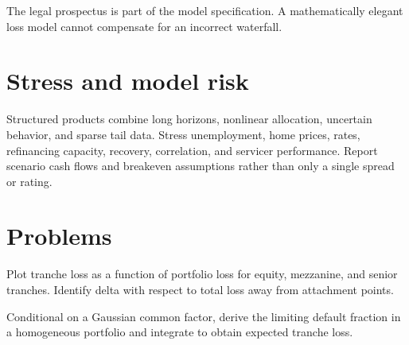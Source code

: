 The legal prospectus is part of the model specification. A mathematically elegant
loss model cannot compensate for an incorrect waterfall.

\section{Stress and model risk}

Structured products combine long horizons, nonlinear allocation, uncertain behavior,
and sparse tail data. Stress unemployment, home prices, rates, refinancing capacity,
recovery, correlation, and servicer performance. Report scenario cash flows and
breakeven assumptions rather than only a single spread or rating.

\section{Problems}

\begin{exercise}
Plot tranche loss as a function of portfolio loss for equity, mezzanine, and senior
tranches. Identify delta with respect to total loss away from attachment points.
\end{exercise}
\begin{exercise}
Conditional on a Gaussian common factor, derive the limiting default fraction in a
homogeneous portfolio and integrate to obtain expected tranche loss.
\end{exercise}
